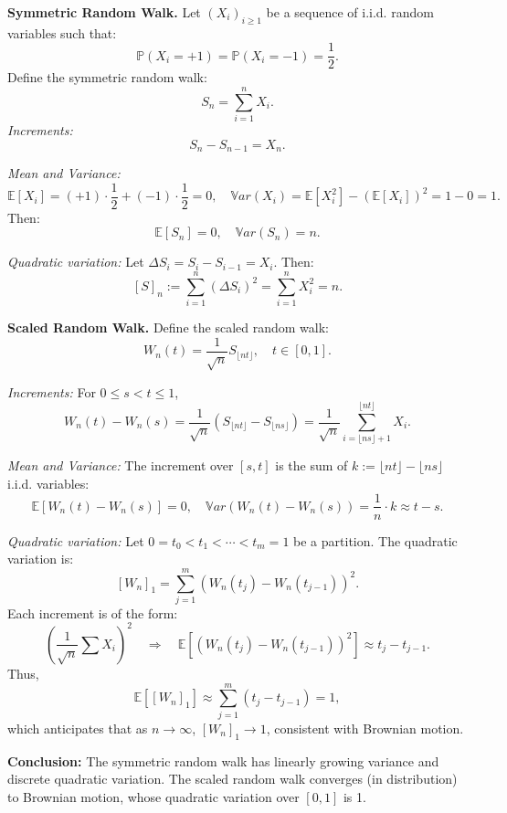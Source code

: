 
\textbf{Symmetric Random Walk.}  
Let \( (X_i)_{i \geq 1} \) be a sequence of i.i.d. random variables such that:
\[
\mathbb{P}(X_i = +1) = \mathbb{P}(X_i = -1) = \frac{1}{2}.
\]
Define the symmetric random walk:
\[
S_n = \sum_{i=1}^n X_i.
\]
\textit{Increments:}  
\[
S_{n} - S_{n-1} = X_n.
\]

\textit{Mean and Variance:}  
\[
\mathbb{E}[X_i] = (+1)\cdot\frac{1}{2} + (-1)\cdot\frac{1}{2} = 0, \quad \mathbb{V}ar(X_i) = \mathbb{E}[X_i^2] - (\mathbb{E}[X_i])^2 = 1 - 0 = 1.
\]
Then:
\[
\mathbb{E}[S_n] = 0, \quad \mathbb{V}ar(S_n) = n.
\]

\textit{Quadratic variation:}  
Let \( \Delta S_i = S_i - S_{i-1} = X_i \). Then:
\[
[S]_n := \sum_{i=1}^n (\Delta S_i)^2 = \sum_{i=1}^n X_i^2 = n.
\]

\vspace{1em}
\textbf{Scaled Random Walk.}  
Define the scaled random walk:
\[
W_n(t) = \frac{1}{\sqrt{n}} S_{\lfloor nt \rfloor}, \quad t \in [0,1].
\]

\textit{Increments:}  
For \( 0 \leq s < t \leq 1 \),
\[
W_n(t) - W_n(s) = \frac{1}{\sqrt{n}} (S_{\lfloor nt \rfloor} - S_{\lfloor ns \rfloor}) = \frac{1}{\sqrt{n}} \sum_{i=\lfloor ns \rfloor + 1}^{\lfloor nt \rfloor} X_i.
\]

\textit{Mean and Variance:}  
The increment over \( [s, t] \) is the sum of \( k := \lfloor nt \rfloor - \lfloor ns \rfloor \) i.i.d. variables:
\[
\mathbb{E}[W_n(t) - W_n(s)] = 0, \quad \mathbb{V}ar(W_n(t) - W_n(s)) = \frac{1}{n} \cdot k \approx t - s.
\]

\textit{Quadratic variation:}  
Let \( 0 = t_0 < t_1 < \cdots < t_m = 1 \) be a partition. The quadratic variation is:
\[
[W_n]_1 = \sum_{j=1}^m (W_n(t_j) - W_n(t_{j-1}))^2.
\]
Each increment is of the form:
\[
\left( \frac{1}{\sqrt{n}} \sum X_i \right)^2 \quad \Rightarrow \quad \mathbb{E}[(W_n(t_j) - W_n(t_{j-1}))^2] \approx t_j - t_{j-1}.
\]
Thus,
\[
\mathbb{E}[ [W_n]_1 ] \approx \sum_{j=1}^m (t_j - t_{j-1}) = 1,
\]
which anticipates that as \( n \to \infty \), \( [W_n]_1 \to 1 \), consistent with Brownian motion.

\vspace{1em}
\textbf{Conclusion:}  
The symmetric random walk has linearly growing variance and discrete quadratic variation. The scaled random walk converges (in distribution) to Brownian motion, whose quadratic variation over \([0,1]\) is 1.